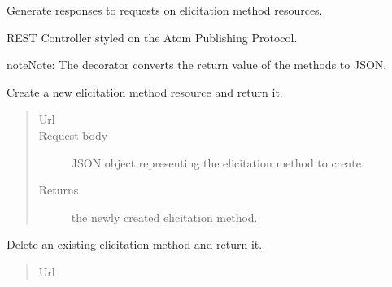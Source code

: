 \documentclass[letterpaper,10pt,english]{sphinxmanual}
\begin{document}
\begin{fulllineitems}
\label{api:onlinelinguisticdatabase.controllers.elicitationmethods.ElicitationmethodsController}
Generate responses to requests on elicitation method resources.

REST Controller styled on the Atom Publishing Protocol.

\begin{notice}{note}{Note:}
The  decorator converts the return value of the methods to
JSON.
\end{notice}

\begin{fulllineitems}
\label{api:onlinelinguisticdatabase.controllers.elicitationmethods.ElicitationmethodsController.create}
Create a new elicitation method resource and return it.
\begin{quote}\begin{description}
\item[{Url }] \leavevmode
{}

\item[{Request body}] \leavevmode
JSON object representing the elicitation method to create.

\item[{Returns}] \leavevmode
the newly created elicitation method.

\end{description}\end{quote}

\end{fulllineitems}


\begin{fulllineitems}
\label{api:onlinelinguisticdatabase.controllers.elicitationmethods.ElicitationmethodsController.delete}
Delete an existing elicitation method and return it.
\begin{quote}\begin{description}
\item[{Url }] \leavevmode
{}


\end{description}
\end{quote}
\end{fulllineitems}
\end{fulllineitems}
\end{document}
